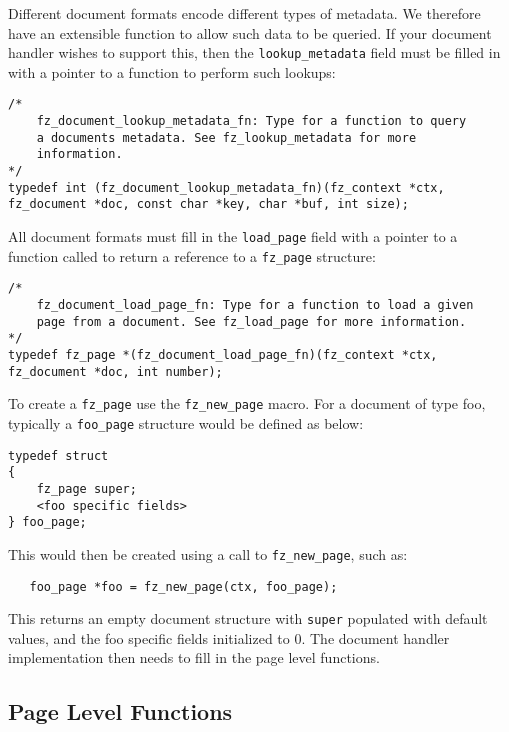 \documentclass[oneside]{book}
\begin{document}
Different document formats encode different types of metadata. We therefore have an extensible function to allow such data to be queried. If your document handler wishes to support this, then the \texttt{lookup\_metadata} field must be filled in with a pointer to a function to perform such lookups:

\begin{lstlisting}
/*
	fz_document_lookup_metadata_fn: Type for a function to query
	a documents metadata. See fz_lookup_metadata for more
	information.
*/
typedef int (fz_document_lookup_metadata_fn)(fz_context *ctx, fz_document *doc, const char *key, char *buf, int size);
\end{lstlisting}

All document formats must fill in the \texttt{load\_page} field with a pointer to a function called to return a reference to a \texttt{fz\_page} structure:

\begin{lstlisting}
/*
	fz_document_load_page_fn: Type for a function to load a given
	page from a document. See fz_load_page for more information.
*/
typedef fz_page *(fz_document_load_page_fn)(fz_context *ctx, fz_document *doc, int number);
\end{lstlisting}

To create a \texttt{fz\_page} use the \texttt{fz\_new\_page} macro. For a document of type foo, typically a \texttt{foo\_page} structure would be defined as below:

\begin{lstlisting}
typedef struct
{
	fz_page super;
	<foo specific fields>
} foo_page;
\end{lstlisting}

This would then be created using a call to \texttt{fz\_new\_page}, such as:

\begin{lstlisting}
   foo_page *foo = fz_new_page(ctx, foo_page);
\end{lstlisting}

This returns an empty document structure with \texttt{super} populated with default values, and the foo specific fields initialized to 0. The document handler implementation then needs to fill in the page level functions.

\subsection{Page Level Functions}
\label{PageLevelFunctions}
\end{document}

